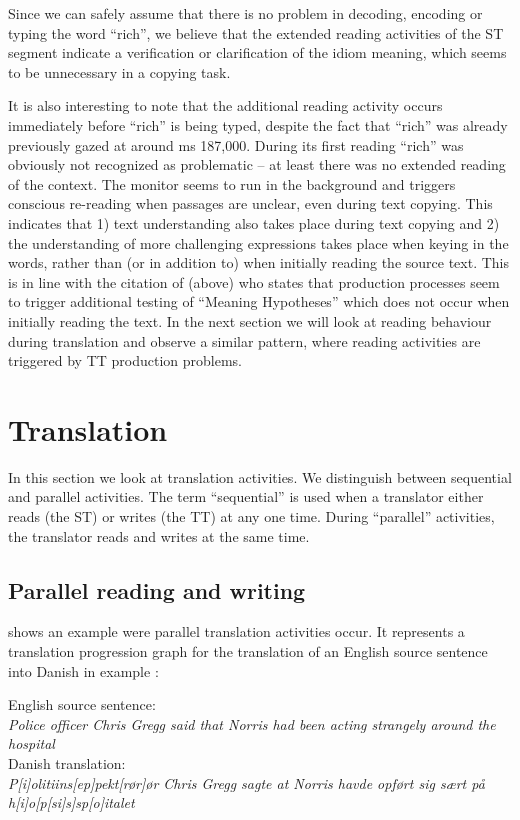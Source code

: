 \documentclass[output=paper]{LSP/langsci}
\begin{document}
Since we can safely assume that there is no problem in decoding, encoding or typing the word ``rich'', we believe that the extended reading activities of the ST segment indicate a verification or clarification of the idiom meaning, which seems to be unnecessary in a copying task. 

It is also interesting to note that the additional reading activity occurs immediately before ``rich'' is being typed, despite the fact that ``rich'' was already previously gazed at around ms 187,000. During its first reading ``rich'' was obviously not recognized as problematic -- at least there was no extended reading of the context. The monitor seems to run in the background and triggers conscious re-reading when passages are unclear, even during text copying. This indicates that 1) text understanding also takes place during text copying and  2) the understanding of more challenging expressions takes place when keying in the words, rather than (or in addition to) when initially reading the source text. This is in line with the citation of \citeauthor{Gile1995} (above) who states that production processes seem to trigger additional testing of ``Meaning Hypotheses'' which does not occur when initially reading the text. In the next section we will look at reading behaviour during translation and observe a similar pattern, where reading activities are triggered by TT production problems.

\section{Translation}\label{sec:carl:4}

In this section we look at translation activities. We distinguish between sequential and parallel activities. The term ``sequential'' is used when a translator either reads (the ST) or writes (the TT) at any one time. During ``parallel'' activities, the translator reads and writes at the same time. 

\subsection{Parallel reading and writing}\label{sec:carl:4.1}

 shows an example were parallel translation activities occur. It represents a translation progression graph for the translation of an English source sentence into Danish in example :

\ea\label{ex:carl:3}
  \ea 
  English source sentence:\\
  \textit{Police officer Chris Gregg said that Norris had been acting strangely around the hospital} \\
  \ex
  Danish translation:\\
  \textit{P[i]olitiins[ep]pekt[rør]ør Chris Gregg sagte at Norris havde opført sig sært på h[i]o[p[si]s]sp[o]italet}  
  \z
\z 
\end{document}
